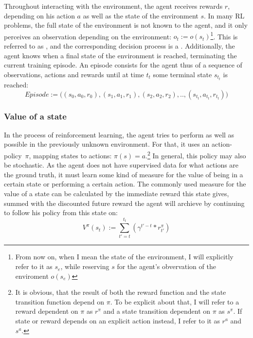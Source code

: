Throughout interacting with the environment, the agent receives rewards $r$, depending on his action $a$ as well as the state of the environment $s$. In many RL problems, the full state of the environment is not known to the agent, and it only perceives an observation depending on the environment: $o_t := o(s_t)$\footnote{From now on, when I mean the state of the environment, I will explicitly refer to it as $s_e$, while reserving $s$ for the agent's obvervation of the enviroment $o(s_e)$}. This is referred to as , and the corresponding decision process is a . Additionally, the agent knows when a final state of the environment is reached, terminating the current training episode. An episode consists for the agent thus of a sequence of observations, actions and rewards until at time $t_t$ some terminal state $s_{t_t}$ is reached: $$Episode := \big((s_0, a_0, r_0), (s_1, a_1, r_1), (s_2,a_2,r_2), .., (s_{t_t}, a_{t_t}, r_{t_t})\big)$$

\subsubsection{Value of a state}
In the process of reinforcement learning, the agent tries to perform as well as possible in the previously unknown environment. For that, it uses an \mbox{action-policy $\pi$,} mapping states to actions: $\pi(s) = a$.\footnote{It is obvious, that the result of both the reward function and the state transition function depend on $\pi$. To be explicit about that, I will refer to a reward dependent on $\pi$ as $r^\pi$ and a state transition dependent on $\pi$ as $s^\pi$. If state or reward depends on an explicit action instead, I refer to it as $r^a$ and $s^a$.}  In general, this policy may also be stochastic. As the agent does not have supervised data for what actions are the ground truth, it must learn some kind of measure for the value of being in a certain state or performing a certain action. The commonly used measure for the value of a state can be calculated by the immediate reward this state gives, summed with the discounted future reward the agent will archieve by continuing to follow his policy from this state on: 
\begin{equation} \label{eq:1.1}
V^\pi(s_t) := \sum_{t'=t}^{t_t} ( \gamma^{t'-t} * r^\pi_{t'} )
\end{equation}

